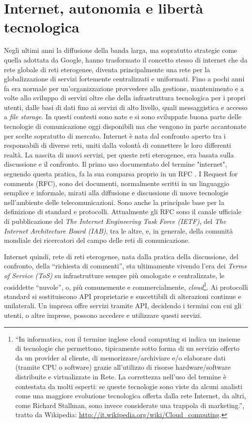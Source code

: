 \section{Internet, autonomia e libertà tecnologica}
Negli ultimi anni la diffusione della banda larga, ma sopratutto
strategie come quella adottata da Google, hanno trasformato il
concetto stesso di internet che da rete globale di reti eterogenee,
diventa principalmente una rete per la globalizzazione di servizi
fortemente centralizzati e uniformati. Fino a pochi anni fa era
normale per un'organizzazione provvedere alla gestione, mantenimento e
a volte allo sviluppo di servizi oltre che della infrastruttura
tecnologica per i propri utenti, dalle basi di dati fino ai servizi di
alto livello, quali messaggistica e accesso a \emph{file storage}. In
questi contesti sono nate e si sono sviluppate buona parte delle
tecnologie di comunicazione oggi disponibili ma che vengono in parte
accantonate per scelte sopratutto di mercato. Internet è nata dal
confronto aperto tra i responsabili di diverse reti, uniti dalla
volontà di connettere le loro differenti realtà. La nascita di nuovi
servizi, per queste reti eterogenee, era basata sulla discussione e il
confronto. Il primo uso documentato del termine "internet", seguendo
questa pratica, fa la sua comparsa proprio in un RFC \citep{RFC675}. I
Request for comments (RFC), sono dei documenti, normalmente scritti in
un linguaggio semplice e informale, mirati alla diffusione e
discussione di nuove tecnologie nell'ambiente delle
telecomunicazioni. Sono anche la principale base per la definizione di
standard e protocolli. Attualmente gli RFC sono il canale ufficiale di
pubblicazione del \emph{The Internet Engineering Task Force (IETF)},
del \emph{The Internet Architecture Board (IAB)}, tra le altre, e, in
generale, della comunità mondiale dei ricercatori del campo delle reti
di comunicazione.

Internet quindi, rete di reti eterogenee, nata dalla pratica della
discussione, del confronto, della ``richiesta di commenti'', sta
ultimamente vivendo l'era dei \emph{Terms of Service (ToS)} su
infrastrutture sempre più omologate e centralizzate, le cosiddette
``nuvole'', o, più comunemente e commercialmente,
\emph{cloud}\footnote{``In informatica, con il termine inglese cloud
  computing si indica un insieme di tecnologie che permettono,
  tipicamente sotto forma di un servizio offerto da un provider al
  cliente, di memorizzare/archiviare e/o elaborare dati (tramite CPU o
  software) grazie all'utilizzo di risorse hardware/software
  distribuite e virtualizzate in Rete.  La correttezza nell'uso del
  termine è contestata da molti esperti: se queste tecnologie sono
  viste da alcuni analisti come una maggiore evoluzione tecnologica
  offerta dalla rete Internet, da altri, come Richard Stallman, sono
  invece considerate una trappola di marketing.'', tratto da
  Wikipedia: \url{http://it.wikipedia.org/wiki/Cloud_computing}.}. Ai
protocolli standard si sostituiscono API proprietarie e suscettibili
di alterazioni continue e unilaterali. Un impresa offre servizi
tramite API, decidendo i termini con cui gli utenti, o altre imprese,
possono accedere e utilizzare questi servizi.

